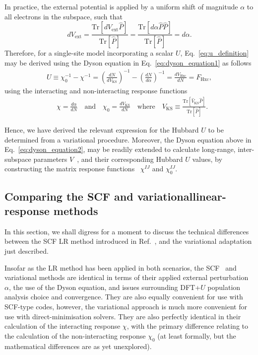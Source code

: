 {In practice,
the external potential is applied by 
a uniform shift of magnitude $\alpha$ 
to all electrons in the subspace, 
such that 
%
\begin{equation}
d V_\textrm{ext}=\frac{\textrm{Tr}[d \hat V_\textrm{ext} \hat P]}{\textrm{Tr}[\hat P]} 
=\frac{\textrm{Tr}[ d \alpha \hat P \hat P]}{\textrm{Tr}[\hat P]} = d \alpha.
\end{equation}}
%
Therefore, 
for a single-site model 
incorporating a scalar $U$, 
Eq.~\eqref{eq:u_definition}
 may be derived using the Dyson equation in 
Eq.~\eqref{eq:dyson_equation1} 
 as follows
%
\begin{align}
U\equiv \chi_0^{-1}-\chi^{-1}
=\left(\frac{dN}{dV_\textrm{KS}}\right)^{-1}-\left(\frac{dN}{d\alpha}\right)^{-1} 
= \frac{dV_\textrm{Hxc}}{dN}
=F_\textrm{Hxc}, 
\label{eq:dyson_equation2}
\end{align}
%
using the interacting and non-interacting response functions
%
\begin{align}
&\chi=\frac{d\alpha}{dN}
\quad\mbox{and}\quad
\chi_0=\frac{dV_\textrm{KS}}{dN}
\quad\mbox{where}\quad
V_\textrm{KS} \equiv \frac{\textrm{Tr}  [\hat{V}_\textrm{KS} \hat{P}]}{ \textrm{Tr}[ \hat{P} ]}. 
\end{align}
%


Hence, we have derived 
the relevant expression for the Hubbard $U$ 
to be determined from a variational procedure.
%
Moreover, 
the Dyson equation above in 
Eq.~\eqref{eq:dyson_equation2}, 
may be readily extended to calculate 
long-range, inter-subspace parameters $V$~\cite{0953-8984-22-5-055602}, 
and their corresponding Hubbard $U$ values, 
by constructing the matrix response functions~\cite{PhysRevB.58.1201}
$\chi^{IJ}$ and $\chi_0^{IJ}$.



\subsection[{Comparing the SCF and variational linear-response methods}]{Comparing the SCF and variational\break linear-response methods}

In this section, 
we shall digress for a moment to discuss 
the technical differences between the 
SCF LR method introduced in Ref.~\cite{PhysRevB.71.035105}, 
and the variational adaptation just described.

Insofar as the LR method has been applied 
in both scenarios, 
the SCF~\cite{PhysRevB.71.035105} 
and variational methods are identical 
in terms of their applied external perturbation $\alpha$, 
the use of the Dyson equation, 
and issues surrounding DFT+$U$ 
population analysis choice and convergence. 
%
They are also equally convenient for use 
with SCF-type codes, 
however, the variational approach 
is much more convenient  for 
use with direct-minimisation solvers.
%
They are also perfectly identical 
in their calculation of  the interacting response $\chi $, 
with the primary difference relating to the 
calculation of the non-interacting response $\chi_0$ 
(at least formally, but the mathematical 
differences are as yet unexplored).

